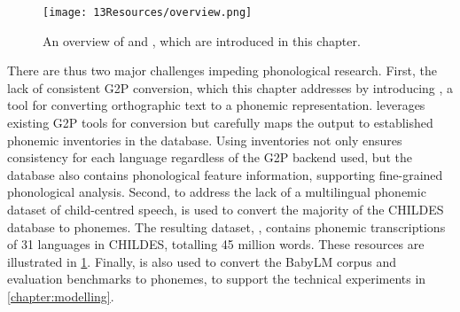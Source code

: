 \begin{figure}[t]
    \centering
    \texttt{[image: 13Resources/overview.png]}
    \caption{An overview of \ipachildes and \gpp, which are introduced in this chapter.}
    \label{fig:13-overview}
\end{figure}



There are thus two major challenges impeding phonological research. First, the lack of consistent G2P conversion, which this chapter addresses by introducing \gpp, a tool for converting orthographic text to a phonemic representation. \gpp leverages existing G2P tools for conversion but carefully maps the output to established phonemic inventories in the \phoible database. Using \phoible inventories not only ensures consistency for each language regardless of the G2P backend used, but the database also contains phonological feature information, supporting fine-grained phonological analysis. Second, to address the lack of a multilingual phonemic dataset of child-centred speech, \gpp is used to convert the majority of the CHILDES database to phonemes. The resulting dataset, \ipachildes, contains phonemic transcriptions of 31 languages in CHILDES, totalling 45 million words. These resources are illustrated in \cref{fig:13-overview}. Finally, \gpp is also used to convert the BabyLM corpus and evaluation benchmarks to phonemes, to support the technical experiments in \cref{chapter:modelling}.



